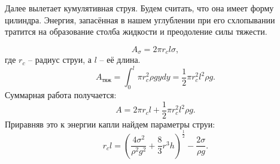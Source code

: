 \documentclass[a4paper, 12pt]{article}
\begin{document}

Далее вылетает кумулятивная струя. Будем считать, что она имеет форму
цилиндра. Энергия, запасённая в нашем углублении при его схлопывании
тратится на образование столба жидкости и преодоление силы тяжести.

\begin{equation}
    A_\sigma = 2\pi{r_c}l\sigma,
\end{equation}
где $r_c$ -- радиус струи, а $l$ -- её длина.
\begin{equation}
    A_\text{тяж} = \int_{0}^{l} \pi{r_c^2}\rho{g}ydy =
                   \frac{1}{2}\pi{r_c^2}l^2\rho{g}.
\end{equation}
Суммарная работа получается:
\begin{equation}
    A = 2\pi{r_c}l + \frac{1}{2}\pi{r_c^2}l^2\rho{g}.
\end{equation}
Приравняв это к энергии капли найдем параметры струи:
\begin{equation}
    r_cl = \left (\frac{4\sigma^2}{\rho^2g^2} + \frac{8}{3}
                  r^3h \right ) ^ \frac{1}{2} - \frac{2\sigma}{\rho{g}}.
\end{equation}
\end{document}
